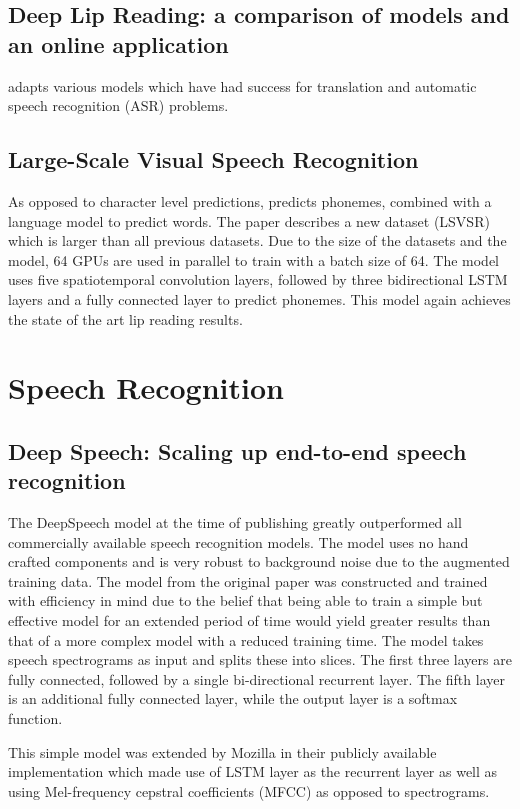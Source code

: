 \documentclass[12pt]{article}
\begin{document}
\subsection{Deep Lip Reading: a comparison of models and an online application}
\cite{Afouras2018} adapts various models which have had success for translation and automatic speech recognition (ASR) problems.

\subsection{Large-Scale Visual Speech Recognition}
As opposed to character level predictions, \cite{Shillingford2018} predicts phonemes, combined with a language model to predict words.
The paper describes a new dataset (LSVSR) which is larger than all previous datasets.
Due to the size of the datasets and the model, 64 GPUs are used in parallel to train with a batch size of 64.
The model uses five spatiotemporal convolution layers, followed by three bidirectional LSTM layers and a fully connected layer to predict phonemes.
This model again achieves the state of the art lip reading results.


\section{Speech Recognition}
\subsection{Deep Speech: Scaling up end-to-end speech recognition}
The DeepSpeech model \cite{Hannun2014} at the time of publishing greatly outperformed all commercially available speech recognition models.
The model uses no hand crafted components and is very robust to background noise due to the augmented training data.
The model from the original paper was constructed and trained with efficiency in mind due to the belief that being able to train a simple but effective model for an extended period of time would yield greater results than that of a more complex model with a reduced training time.
The model takes speech spectrograms as input and splits these into slices.
The first three layers are fully connected, followed by a single bi-directional recurrent layer.
The fifth layer is an additional fully connected layer, while the output layer is a softmax function.

This simple model was extended by Mozilla in their publicly available implementation which made use of LSTM layer as the recurrent layer as well as using Mel-frequency cepstral coefficients (MFCC) as opposed to spectrograms.
\end{document}
